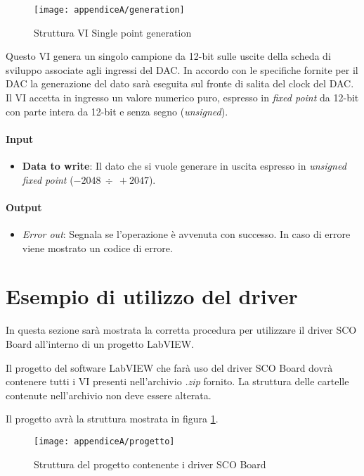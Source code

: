\begin{figure}[H]  
	\begin{center}
		\texttt{[image: appendiceA/generation]}
		\caption{Struttura VI Single point generation}
	\end{center}
\end{figure}

Questo VI genera un singolo campione da 12-bit sulle uscite della scheda di sviluppo associate agli ingressi del DAC. 
In accordo con le specifiche fornite per il DAC la generazione del dato sarà eseguita sul fronte di salita del clock del DAC. Il VI accetta in ingresso un valore numerico puro, espresso in \textit{fixed point} da 12-bit con parte intera da 12-bit e senza segno (\textit{unsigned}).
\paragraph*{Input}
\begin{itemize}
	\item \textbf{Data to write}: Il dato che si vuole generare in uscita espresso in \textit{unsigned fixed point} ($-2048 \ \div \ +2047$).
\end{itemize}

\paragraph*{Output}
\begin{itemize}
	\item \textit{Error out}: Segnala se l'operazione è avvenuta con successo. In caso di errore viene mostrato un codice di errore.
\end{itemize}

\section*{Esempio di utilizzo del driver}
In questa sezione sarà mostrata la corretta procedura per utilizzare il driver SCO Board all'interno di un progetto LabVIEW.

Il progetto del software LabVIEW che farà uso del driver SCO Board dovrà contenere tutti i VI presenti nell'archivio \textit{.zip} fornito. La struttura delle cartelle contenute nell'archivio non deve essere alterata.

Il progetto avrà la struttura mostrata in figura \ref{progetto}.

\begin{figure}[H]
	\begin{center}
		\texttt{[image: appendiceA/progetto]}
		\caption{Struttura del progetto contenente i driver SCO Board}
		\label{progetto}
	\end{center}
\end{figure}


